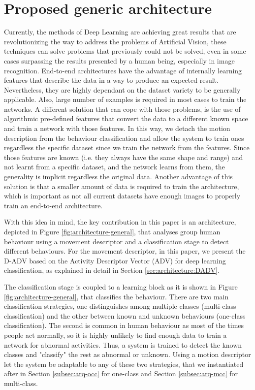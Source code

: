 \section{Proposed generic architecture}\label{sec:parchitecture}

Currently, the methods of Deep Learning are achieving great results that are revolutionizing the way to address the problems of Artificial Vision, these techniques can solve problems that previously could not be solved, even in some cases surpassing the results presented by a human being, especially in image recognition. End-to-end architectures have the advantage of internally learning features that describe the data in a way to produce an expected result. Nevertheless, they are highly dependant on the dataset variety to be generally applicable. Also, large number of examples is required in most cases to train the networks. A different solution that can cope with those problems, is the use of algorithmic pre-defined features that convert the data to a different known space and train a network with those features. In this way, we detach the motion description from the behaviour classification and allow the system to train ones regardless the specific dataset since we train the network from the features. Since those features are known (i.e. they always have the same shape and range) and not learnt from a specific dataset, and the network learns from them, the generality is implicit regardless the original data. Another advantage of this solution is that a smaller amount of data is required to train the architecture, which is important as not all current datasets have enough images to properly train an end-to-end architecture.

With this idea in mind, the key contribution in this paper is an architecture, depicted in Figure \ref{fig:architecture-general}, that analyses group human behaviour using a movement descriptor and a classification stage to detect different behaviours. For the movement descriptor, in this paper, we present the D-ADV based on the Activity Descriptor Vector (ADV) for deep learning classification, as explained in detail in Section \ref{sec:architecture:DADV}. 

The classification stage is coupled to a learning block as it is shown in Figure \ref{fig:architecture-general}, that classifies the behaviour. There are two main classification strategies, one distinguishes among multiple classes (multi-class classification) and the other between known and unknown behaviours (one-class classification). The second is common in human behaviour as most of the times people act normally, so it is highly unlikely to find enough data to train a network for abnormal activities. Thus, a system is trained to detect the known classes and "classify" the rest as abnormal or unknown. Using a motion descriptor let the system be adaptable to any of these two strategies, that we instantiated after in Section \ref{subsec:arq-occ} for one-class and Section \ref{subsec:arq-mcc} for multi-class.

